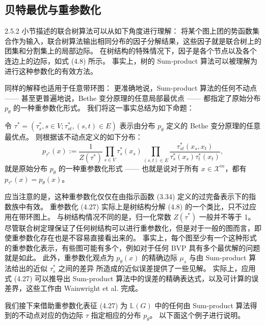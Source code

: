 \subsection{贝特最优与重参数化}

2.5.2 小节描述的联合树算法可以从如下角度进行理解：
将某个图上团的势函数集合作为输入，联合树算法输出相同分布的因子分解结果，这些因子就是联合树上的团集和分割集上的局部边际。
在树结构的特殊情况下，因子是各个节点以及各个连边上的边际，如式 (4.8) 所示。
事实上，树的 Sum-product 算法可以被理解为进行这种参数化的有效方法。

同样的解释也适用于任意带环图：
更准确地说，Sum-product 算法的任何不动点 —— 甚至更普遍地说，Bethe 变分原理的任意局部最优点 —— 都指定了原始分布 $p_{\theta}$ 的一种重参数化形式。
我们将这一事实总结为如下命题：

\begin{tcolorbox}
\begin{prop}

令 $\tau^* = (\tau_s^*, s \in V; \tau_{st}^*, (s, t) \in E)$ 表示由分布 $p_{\theta}$ 定义的 Bethe 变分原理的任意最优点。
则根据该不动点定义的如下分布：
\begin{equation}
    p_{\tau^*}(x) := \frac{1}{Z(\tau^*)}\prod_{s \in V}\tau_s^*(x_s)\prod_{(s, t) \in E}\frac{\tau_{st}^*(x_s, x_t)}{\tau_s^*(x_s)\tau_t^*(x_t)},
\end{equation}
就是原始分布 $p_{\theta}$ 的一种重参数化形式 —— 也就是说对于所有 $x \in \mathcal{X}^m$，都有 $p_{\tau^*}(x) = p_{\theta}(x)$。

\end{prop}
\end{tcolorbox}

应当注意的是，这种重参数化仅仅在由指示函数 (3.34) 定义的过完备表示下的指数族中有效。
重参数化 (4.27) 实际上是树结构分解 (4.8) 的一个类比，只不过应用在带环图上。
与树结构情况不同的是，归一化常数 $Z(\tau^*)$ 一般并不等于 1。
尽管联合树定理保证了任何树结构可以进行重参数化，但是对于一般的图而言，即使重参数化存在也是不容易直接看出来的。
事实上，每个图至少有一个这种形式的重参数化表示，有些图可能有多个，例如对于任何 BVP 具有多个最优解的问题就是如此。
此外，重参数化观点为 $p_{\theta}(x)$ 的精确边际 $\mu_s$ 与由 Sum-product 算法给出的近似 $\tau_s^*$ 之间的差异 所造成的近似误差提供了一些见解。
实际上，应用式 (4.27) 可以推导出 Sum-product 算法中的误差的精确表达式，以及可计算的误差界，这些工作由 Wainwright et al. 完成。

我们接下来借助重参数化表征 (4.27) 为 $\mathbb{L}(G)$ 中的任何由 Sum-product 算法得到的不动点对应的伪边际 $\tau$ 指定相应的分布 $p_{\theta}$。
以下面这个例子进行说明。

